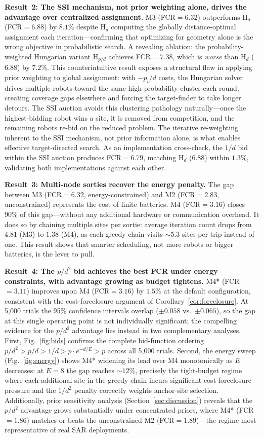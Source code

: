 \documentclass[conference]{IEEEtran}
\begin{document}
\textbf{Result~2: The SSI mechanism, not prior weighting alone, drives the
advantage over centralized assignment.}
M3 (FCR$=6.32$) outperforms $\mathrm{H}_d$ (FCR$=6.88$) by $8.1\%$ despite
$\mathrm{H}_d$ computing the globally distance-optimal assignment each
iteration---confirming that optimizing for geometry alone is the wrong
objective in probabilistic search.
A revealing ablation: the probability-weighted Hungarian variant
$\mathrm{H}_{p/d}$ achieves FCR$=7.38$, which is \emph{worse} than
$\mathrm{H}_d$ ($6.88$) by $7.2\%$.
This counterintuitive result exposes a structural flaw in applying prior
weighting to global assignment: with $-p_i/d$ costs, the Hungarian solver
drives multiple robots toward the same high-probability cluster each round,
creating coverage gaps elsewhere and forcing the target-finder to take
longer detours.
The SSI auction avoids this clustering pathology naturally---once the
highest-bidding robot wins a site, it is removed from competition,
and the remaining robots re-bid on the reduced problem.
The iterative re-weighting inherent to the SSI mechanism, not prior
information alone, is what enables effective target-directed search.
As an implementation cross-check, the $1/d$ bid within the SSI auction
produces FCR$=6.79$, matching $\mathrm{H}_d$ ($6.88$) within $1.3\%$,
validating both implementations against each other.

\textbf{Result~3: Multi-node sorties recover the energy penalty.}
The gap between M3 (FCR$=6.32$, energy-constrained) and M2 (FCR$=2.83$,
unconstrained) represents the cost of finite batteries.
M4 (FCR$=3.16$) closes $90\%$ of this gap---without any additional hardware
or communication overhead.
It does so by chaining multiple sites per sortie: average iteration count
drops from $4.81$ (M3) to $1.38$ (M4), as each greedy chain visits
${\sim}5.3$ sites per trip instead of one.
This result shows that smarter scheduling, not more robots or bigger
batteries, is the lever to pull.

\textbf{Result~4: The $p/d^2$ bid achieves the best FCR under energy
constraints, with advantage growing as budget tightens.}
M4* (FCR$=3.11$) improves upon M4 (FCR$=3.16$) by $1.5\%$ at the default
configuration, consistent with the cost-foreclosure argument of
Corollary~\ref{cor:foreclosure}.
At 5,000 trials the 95\% confidence intervals overlap ($\pm0.058$ vs.\
$\pm0.065$), so the gap at this single operating point is not individually
significant; the compelling evidence for the $p/d^2$ advantage lies
instead in two complementary analyses.
First, Fig.~\ref{fig:bids} confirms the complete bid-function ordering
$p/d^2 > p/d > 1/d > p{\cdot}e^{-d/E} > p$ across all 5,000 trials.
Second, the energy sweep (Fig.~\ref{fig:energy}) shows M4* widening
its lead over M4 monotonically as $E$ decreases: at $E{=}8$ the gap
reaches ${\sim}12\%$, precisely the tight-budget regime where each
additional site in the greedy chain incurs significant cost-foreclosure
pressure and the $1/d^2$ penalty correctly weights anchor-site selection.
Additionally, prior sensitivity analysis (Section~\ref{sec:discussion})
reveals that the $p/d^2$ advantage grows substantially under concentrated
priors, where M4* (FCR$=1.86$) matches or beats the unconstrained M2
(FCR$=1.89$)---the regime most representative of real SAR deployments.
\end{document}
